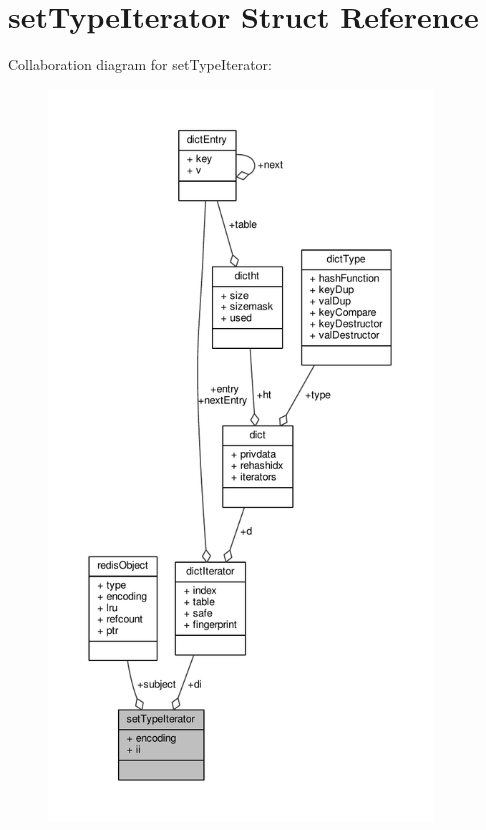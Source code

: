 \hypertarget{structsetTypeIterator}{}\section{set\+Type\+Iterator Struct Reference}
\label{structsetTypeIterator}


Collaboration diagram for set\+Type\+Iterator\+:\nopagebreak
\begin{figure}[H]
\begin{center}
\leavevmode
\includegraphics[height=550pt]{structsetTypeIterator__coll__graph}
\end{center}
\end{figure}
